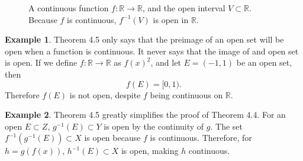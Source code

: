 \documentclass{article}
\newcommand{\R}{\mathbb{R}}
\theoremstyle{definition}
\newtheorem{example}{Example}[section]
\begin{document}
\begin{figure}[h!]
	\centering
	\caption{A continuous function $ f:\R\to\R $, and the open interval $ V\subset \R $. Because $ f $ is continuous, $ f^{-1}(V) $ is open in $ \R $. }
\end{figure}
\begin{example}
Theorem 4.5 only says that the preimage of an open set will be open when a function is continuous. It never says that the image of and open set is open. If we define $ f:\R\to\R $ as $ f(x)^2 $, and let $ E=(-1,1) $ be an open set, then $$f(E)=[0,1) .$$ Therefore $ f(E) $ is not open, despite $ f $ being continuous on $ \R $. 
\end{example}
\begin{example}
	Theorem 4.5 greatly simplifies the proof of Theorem 4.4. For an open $ E\subset Z $, $ g^{-1}(E)\subset Y $ is open by the continuity of $ g $. The set $ f^{-1}(g^{-1}(E))\subset X $ is open because $ f $ is continuous. Therefore, for $ h=g(f(x)) $, $ h^{-1}(E)\subset X $ is open, making $ h $ continuous. 
\end{example}
\end{document}
